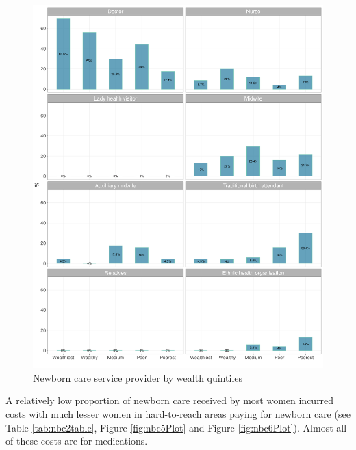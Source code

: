 \documentclass[12pt,a4paper]{article}
\begin{document}
\begin{figure}[H]

{\centering \includegraphics{kayinReport_files/figure-latex/nbc4Plot-1} 

}

\caption{Newborn care service provider by wealth quintiles}\label{fig:nbc4Plot}
\end{figure}

A relatively low proportion of newborn care received by most women incurred costs with much lesser women in hard-to-reach areas paying for newborn care (see Table \ref{tab:nbc2table}, Figure \ref{fig:nbc5Plot} and Figure \ref{fig:nbc6Plot}). Almost all of these costs are for medications.
\end{document}
